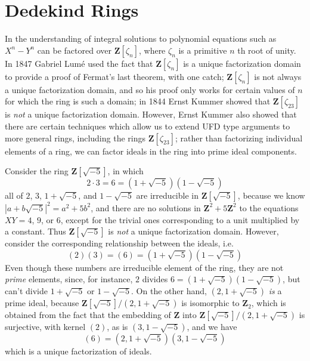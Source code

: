 \chapter{Dedekind Rings}

In the understanding of integral solutions to polynomial equations such as $X^n - Y^n$ can be factored over $\mathbf{Z}[\zeta_n]$, where $\zeta_n$ is a primitive $n$ th root of unity. In 1847 Gabriel Lum\'{e} used the fact that $\mathbf{Z}[\zeta_n]$ is a unique factorization domain to provide a proof of Fermat's last theorem, with one catch; $\mathbf{Z}[\zeta_n]$ is not always a unique factorization domain, and so his proof only works for certain values of $n$ for which the ring is such a domain; in 1844 Ernst Kummer showed that $\mathbf{Z}[\zeta_{23}]$ is {\it not} a unique factorization domain. However, Ernst Kummer also showed that there are certain techniques which allow us to extend UFD type arguments to more general rings, including the rings $\mathbf{Z}[\zeta_{23}]$; rather than factorizing individual elements of a ring, we can factor ideals in the ring into prime ideal components.

\begin{example}
    Consider the ring $\mathbf{Z}[\sqrt{-5}]$, in which
    \[ 2 \cdot 3 = 6 = (1 + \sqrt{-5})(1 - \sqrt{-5}) \]
    all of $2$, $3$, $1 + \sqrt{-5}$, and $1 - \sqrt{-5}$ are irreducible in $\mathbf{Z}[\sqrt{-5}]$, because we know $|a + b\sqrt{-5}|^2 = a^2 + 5b^2$, and there are no solutions in $\mathbf{Z}^2 + 5\mathbf{Z}^2$ to the equations $XY = 4$, $9$, or $6$, except for the trivial ones corresponding to a unit multiplied by a constant. Thus $\mathbf{Z}[\sqrt{-5}]$ is {\it not} a unique factorization domain. However, consider the corresponding relationship between the ideals, i.e.
    \[ (2) (3) = (6) = (1 + \sqrt{-5})(1 - \sqrt{-5}) \]
    Even though these numbers are irreducible element of the ring, they are not {\it prime} elements, since, for instance, $2$ divides $6 = (1 + \sqrt{-5})(1 - \sqrt{-5})$, but can't divide $1 + \sqrt{-5}$ or $1 - \sqrt{-5}$. On the other hand, $(2, 1 + \sqrt{-5})$ {\it is} a prime ideal, because $\mathbf{Z}[\sqrt{-5}]/(2, 1 + \sqrt{-5})$ is isomorphic to $\mathbf{Z}_2$, which is obtained from the fact that the embedding of $\mathbf{Z}$ into $\mathbf{Z}[\sqrt{-5}]/(2, 1 + \sqrt{-5})$ is surjective, with kernel $(2)$, as is $(3, 1 - \sqrt{-5})$, and we have
    \[ (6) = (2, 1 + \sqrt{-5})(3, 1 - \sqrt{-5}) \]
    which is a unique factorization of ideals.
\end{example}

